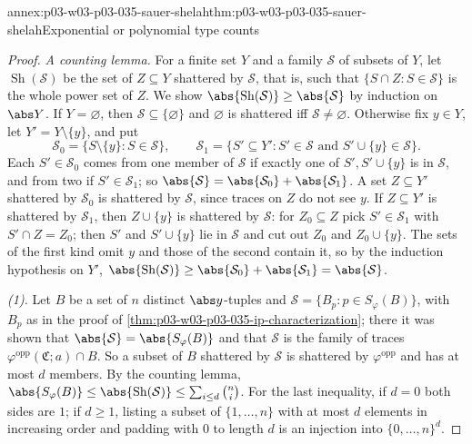 \begin{annexitem}{annex:p03-w03-p03-035-sauer-shelah}{thm:p03-w03-p03-035-sauer-shelah}{Exponential or polynomial type counts}
\begin{proof}
\emph{A counting lemma.}  For a finite set \(Y\) and a family \(\mathcal S\)
of subsets of \(Y\), let \(\operatorname{Sh}(\mathcal S)\) be the set of
\(Z\subseteq Y\) shattered by \(\mathcal S\), that is, such that
\(\{S\cap Z:S\in\mathcal S\}\) is the whole power set of \(Z\).  We show
\(\abs{\operatorname{Sh}(\mathcal S)}\geq\abs{\mathcal S}\) by induction on
\(\abs Y\).  If \(Y=\varnothing\), then \(\mathcal S\subseteq\{\varnothing\}\)
and \(\varnothing\) is shattered iff \(\mathcal S\neq\varnothing\).  Otherwise
fix \(y\in Y\), let \(Y'=Y\setminus\{y\}\), and put
\[
  \mathcal S_0=\{S\setminus\{y\}:S\in\mathcal S\},\qquad
  \mathcal S_1=\{S'\subseteq Y':S'\in\mathcal S\text{ and }
  S'\cup\{y\}\in\mathcal S\}.
\]
Each \(S'\in\mathcal S_0\) comes from one member of \(\mathcal S\) if exactly
one of \(S',S'\cup\{y\}\) is in \(\mathcal S\), and from two if
\(S'\in\mathcal S_1\); so \(\abs{\mathcal S}=\abs{\mathcal S_0}+
\abs{\mathcal S_1}\).  A set \(Z\subseteq Y'\) shattered by \(\mathcal S_0\)
is shattered by \(\mathcal S\), since traces on \(Z\) do not see \(y\).  If
\(Z\subseteq Y'\) is shattered by \(\mathcal S_1\), then \(Z\cup\{y\}\) is
shattered by \(\mathcal S\): for \(Z_0\subseteq Z\) pick \(S'\in\mathcal S_1\)
with \(S'\cap Z=Z_0\); then \(S'\) and \(S'\cup\{y\}\) lie in \(\mathcal S\)
and cut out \(Z_0\) and \(Z_0\cup\{y\}\).  The sets of the first kind omit
\(y\) and those of the second contain it, so by the induction hypothesis on
\(Y'\),
\(\abs{\operatorname{Sh}(\mathcal S)}\geq\abs{\mathcal S_0}+\abs{\mathcal S_1}
=\abs{\mathcal S}\).

\emph{(1).}  Let \(B\) be a set of \(n\) distinct \(\abs y\)-tuples and
\(\mathcal S=\{B_p:p\in S_\varphi(B)\}\), with \(B_p\) as in the proof of
\cref{thm:p03-w03-p03-035-ip-characterization}; there it was shown that
\(\abs{\mathcal S}=\abs{S_\varphi(B)}\) and that \(\mathcal S\) is the family of
traces \(\varphi^{\mathrm{opp}}(\mathfrak C;a)\cap B\).  So a subset of \(B\)
shattered by \(\mathcal S\) is shattered by \(\varphi^{\mathrm{opp}}\) and has
at most \(d\) members.  By the counting lemma,
\(\abs{S_\varphi(B)}\leq\abs{\operatorname{Sh}(\mathcal S)}\leq
\sum_{i\leq d}\binom ni\).  For the last inequality, if \(d=0\) both sides are
\(1\); if \(d\geq1\), listing a subset of \(\{1,\ldots,n\}\) with at most \(d\)
elements in increasing order and padding with \(0\) to length \(d\) is an
injection into \(\{0,\ldots,n\}^d\).


\end{proof}
\end{annexitem}
